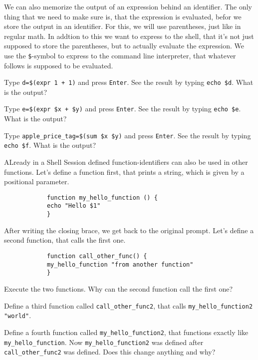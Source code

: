 \begin{challenge}
    \begin{task}
        We can also memorize the output of an expression behind an identifier.
        The only thing that we need to make sure is, that the expression is evaluated, befor we store the output in an identifier.
        For this, we will use parentheses, just like in regular math. 
        In addtion to this we want to express to the shell, that it's not just supposed to store the parentheses, but to actually evaluate the expression.
        We use the \texttt{\$}-symbol to express to the command line interpreter, that whatever follows is supposed to be evaluated.
        \begin{questions}
            \item Type \texttt{d=\$(expr 1 + 1)} and press \texttt{Enter}. See the result by typing \texttt{echo \$d}. What is the output?
            \item Type \texttt{e=\$(expr \$x + \$y)} and press \texttt{Enter}. See the result by typing \texttt{echo \$e}. What is the output?
            \item Type \texttt{apple_price_tag=\$(sum \$x \$y)} and press \texttt{Enter}. See the result by typing \texttt{echo \$f}. What is the output?
        \end{questions}
    \end{task}

    \begin{task}
        ALready in a Shell Session defined function-identifiers can also be used in other functions.
        Let's define a function first, that prints a string, which is given by a positional parameter.
        \begin{lstlisting}
            function my_hello_function () { 
            echo "Hello $1" 
            }
        \end{lstlisting}
        After writing the closing brace, we get back to the original prompt. 
        Let's define a second function, that calls the first one.
        \begin{lstlisting}
            function call_other_func() { 
            my_hello_function "from another function" 
            }
        \end{lstlisting}
        
        \begin{questions}
            \item Execute the two functions. Why can the second function call the first one?
            \item Define a third function called \texttt{call_other_func2}, that calls \texttt{my_hello_function2 "world"}.
            \item Define a fourth function called \texttt{my_hello_function2}, that functions exactly like \texttt{my_hello_function}. Now \texttt{my_hello_function2} was defined after \texttt{call_other_func2} was defined. Does this change anything and why?
        \end{questions}
    \end{task}


\end{challenge}
